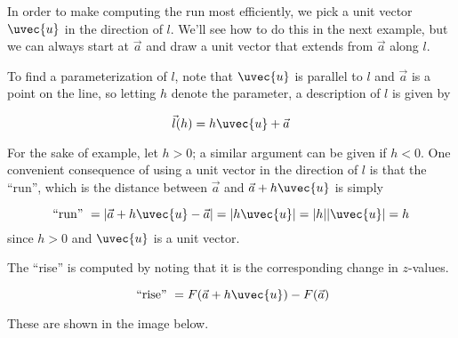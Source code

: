 \documentclass{ximera}
\begin{document}
In order to make computing the run most efficiently, we pick a unit vector $\uvec{u}$ in the direction of $l$.  We'll see how to do this in the next example, but we can always start at $\vec{a}$ and draw a unit vector that extends from $\vec{a}$ along $l$.  

To find a parameterization of $l$, note that $\uvec{u}$ is parallel to $l$ and $\vec{a}$ is a point on the line, so letting $h$ denote the parameter, a description of $l$ is given by

\[
\vec{l}(h) = h \uvec{u} + \vec{a}
\]

For the sake of example, let $h>0$; a similar argument can be given if $h<0$.  One convenient consequence of using a unit vector in the direction of $l$ is that the ``run'', which is the distance between $\vec{a}$ and $\vec{a}+h\uvec{u}$ is simply

\[
\textrm{``run'' } = \left|\vec{a}+h\uvec{u} - \vec{a}\right| = |h \uvec{u}| = |h| |\uvec{u}| = h
\]
since $h>0$ and $\uvec{u}$ is a unit vector.

The ``rise'' is computed by noting that it is the corresponding change in $z$-values.

\[
\textrm{ ``rise'' } = F(\vec{a}+h\uvec{u})-F(\vec{a})
\] 

These are shown in the image below.
\end{document}
